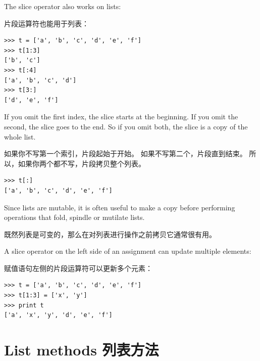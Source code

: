 \documentclass[10pt]{book}
\begin{document}
\begin{CJK}{UTF8}{gbsn}
The slice operator also works on lists:

片段运算符也能用于列表：

\begin{verbatim}
>>> t = ['a', 'b', 'c', 'd', 'e', 'f']
>>> t[1:3]
['b', 'c']
>>> t[:4]
['a', 'b', 'c', 'd']
>>> t[3:]
['d', 'e', 'f']
\end{verbatim}
%
If you omit the first index, the slice starts at the beginning.
If you omit the second, the slice goes to the end.  So if you
omit both, the slice is a copy of the whole list.

如果你不写第一个索引，片段起始于开始。
如果不写第二个，片段直到结束。
所以，如果你两个都不写，片段拷贝整个列表。

\begin{verbatim}
>>> t[:]
['a', 'b', 'c', 'd', 'e', 'f']
\end{verbatim}
%
Since lists are mutable, it is often useful to make a copy
before performing operations that fold, spindle or mutilate
lists.

既然列表是可变的，那么在对列表进行操作之前拷贝它通常很有用。

A slice operator on the left side of an assignment
can update multiple elements:

赋值语句左侧的片段运算符可以更新多个元素：

\begin{verbatim}
>>> t = ['a', 'b', 'c', 'd', 'e', 'f']
>>> t[1:3] = ['x', 'y']
>>> print t
['a', 'x', 'y', 'd', 'e', 'f']
\end{verbatim}
%


%

%


\section{List methods 列表方法}


\end{CJK}
\end{document}
